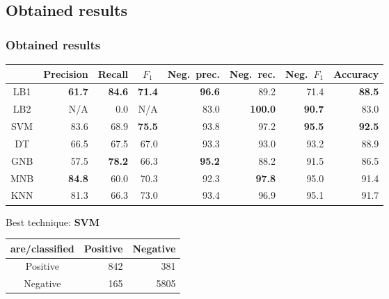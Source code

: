 \subsection{Obtained results}
\begin{frame}
    \frametitle{Obtained results}

    \begin{center}
        \scriptsize
        \begin{tabular}{ c r r r r r r r }
            & \multicolumn{1}{c}{Precision} & \multicolumn{1}{c}{Recall} & \multicolumn{1}{c}{$F_1$} & \multicolumn{1}{c}{Neg.\ prec.} & \multicolumn{1}{c}{Neg.\ rec.} & \multicolumn{1}{c}{Neg.\ $F_1$} & \multicolumn{1}{c}{Accuracy} \\
            \midrule
            LB1 & \textbf{61.7} & \textbf{84.6} & \textbf{71.4} & \textbf{96.6} & 89.2 & 71.4 & \textbf{88.5} \\
            \midrule
            LB2 & N/A & 0.0 & N/A & 83.0 & \textbf{100.0} & \textbf{90.7} & 83.0 \\
            \midrule
            \midrule
            SVM & 83.6 & 68.9 & \textbf{75.5} & 93.8 & 97.2 & \textbf{95.5} & \textbf{92.5} \\
            \midrule
            DT & 66.5 & 67.5 & 67.0 & 93.3 & 93.0 & 93.2 & 88.9 \\
            \midrule
            GNB & 57.5 & \textbf{78.2} & 66.3 & \textbf{95.2} & 88.2 & 91.5 & 86.5 \\
            \midrule
            MNB & \textbf{84.8} & 60.0 & 70.3 & 92.3 & \textbf{97.8} & 95.0 & 91.4 \\
            \midrule
            KNN & 81.3 & 66.3 & 73.0 & 93.4 & 96.9 & 95.1 & 91.7 \\
        \end{tabular}

        \begin{center}
            Best technique: \textbf{SVM}
        \end{center}

        \begin{tabular}{ c r r }
            \textbf{are/classified} & Positive & Negative \\
            \midrule
            Positive & 842 & 381 \\
            \midrule
            Negative & 165 & 5805 \\
        \end{tabular}
    \end{center}
\end{frame}

